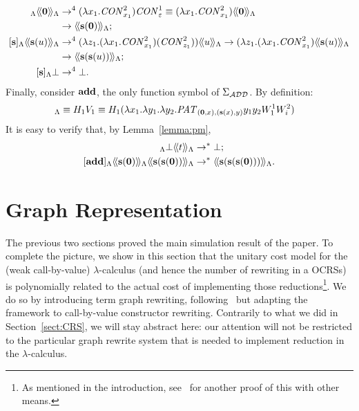 \documentclass{LMCS}
\newcommand{\varone}{x}
\newcommand{\vartwo}{y}
\newcommand{\varthree}{z}
\newcommand{\valueone}{V}
\newcommand{\valuetwo}{W}
\newcommand{\termone}{t}
\newcommand{\termtwo}{u}
\newcommand{\TRStolambdaI}[1]{\langle\!\langle #1\rangle\!\rangle_{\Lambdaterms}}
\newcommand{\TRStolambdaII}[1]{[#1]_{\Lambdaterms}}
\newcommand{\errorterm}{\bot}
\newcommand{\Lambdaterms}{\Lambda}
\newcommand{\Functions}[1]{\Sigma_{#1}}
\newcounter{number}
\begin{document}
\begin{align*}
\TRStolambdaII{\suc}\TRStolambdaI{\zero}&\rightarrow^4(\lambda\varone_1.\conslambda^2_{\varone_1})\conslambda^1_{\varepsilon}
   \equiv(\lambda\varone_1.\conslambda^2_{\varone_1})\TRStolambdaI{\zero}\\
   &\rightarrow\TRStolambdaI{\suc(\zero)};\\
\TRStolambdaII{\suc}\TRStolambdaI{\suc(\termtwo)}&\rightarrow^4(\lambda\varthree_1.(\lambda\varone_1.\conslambda^2_{\varone_1})
  (\conslambda^2_{\varthree_1}))\TRStolambdaI{\termtwo}\rightarrow(\lambda\varthree_1.(\lambda\varone_1.\conslambda^2_{\varone_1})
  \TRStolambdaI{\suc(\termtwo)}\\
  &\rightarrow\TRStolambdaI{\suc(\suc(\termtwo))};\\
\TRStolambdaII{\suc}\errorterm&\rightarrow^4\errorterm.
\end{align*}
Finally, consider $\mathbf{add}$, the only function symbol of $\Functions{\TRSadd}$. By definition:
\begin{align*}
\TRStolambdaII{\add}&\equiv H_1\valueone_1\equiv H_1(\lambda\varone_1.\lambda\vartwo_1.\lambda\vartwo_2.
   \patlambda_{(\zero,\varone),(\suc(\varone),\vartwo)}\vartwo_1\vartwo_2\valuetwo_1^1\valuetwo_i^{2})
\end{align*}
It is easy to verify that, by Lemma~\ref{lemma:pm},
\begin{align*}
\TRStolambdaII{\add}\errorterm\TRStolambdaI{\termone}&\rightarrow^*\errorterm;\\
\TRStolambdaII{\add}\TRStolambdaI{\suc(\zero)}\TRStolambdaI{\suc(\suc(\zero))}&\rightarrow^*\TRStolambdaI{\suc(\suc(\suc(\zero)))}.
\end{align*}
\section{Graph Representation}
\label{Sect:GraphRep}
The previous two sections proved the main simulation result of the paper.
To complete the picture, we show in this section that the unitary cost model
for the (weak call-by-value) $\lambda$-calculus (and hence the number of
rewriting in a OCRSs) is polynomially related to the actual cost of implementing those 
reductions\footnote{As mentioned in the introduction, see~\cite{Sands:Lambda02} for another 
proof of this with other means.}. We do so by introducing term graph rewriting, following~\cite{TGRbarendregt} but
adapting the framework to call-by-value constructor rewriting. Contrarily to what
we did in Section~\ref{sect:CRS}, we will stay abstract here: our attention will
not be restricted to the particular graph rewrite system that is needed to implement 
reduction in the $\lambda$-calculus. 
\end{document}
